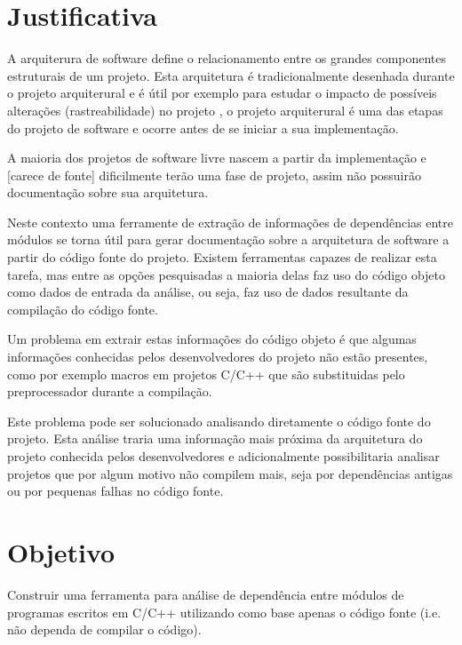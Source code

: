 \chapter{Justificativa}

A arquiterura de software define o relacionamento entre os grandes componentes
estruturais de um projeto\cite{EngenhariaDeSoftwarePressman}. Esta arquitetura
é tradicionalmente desenhada durante o projeto arquiterural e é útil por
exemplo para estudar o impacto de possíveis alterações (rastreabilidade) no
projeto \cite{mata26-terceiro-projeto-piloto}, o projeto arquiterural é uma das
etapas do projeto de software e ocorre antes de se iniciar a sua implementação.

A maioria dos projetos de software livre nascem a partir da implementação e
[carece de fonte] dificilmente terão uma fase de projeto, assim não possuirão
documentação sobre sua arquitetura. 

Neste contexto uma ferramente de extração de informações de dependências entre
módulos se torna útil para gerar documentação sobre a arquitetura de software a
partir do código fonte do projeto. Existem ferramentas capazes de realizar esta
tarefa, mas entre as opções pesquisadas\cite{SourceVersusObjectCodeExtraction}
a maioria delas faz uso do código objeto como dados de entrada da análise, ou
seja, faz uso de dados resultante da compilação do código fonte.

Um problema em extrair estas informações do código objeto é que algumas
informações conhecidas pelos desenvolvedores do projeto não estão presentes,
como por exemplo macros em projetos C/C++ que são substituidas pelo
preprocessador\cite{SourceVersusObjectCodeExtraction} durante a compilação.

Este problema pode ser solucionado analisando diretamente o código fonte do
projeto. Esta análise traria uma informação mais próxima da arquitetura do
projeto conhecida pelos desenvolvedores e adicionalmente possibilitaria
analisar projetos que por algum motivo não compilem mais, seja por dependências
antigas ou por pequenas falhas no código fonte.

\chapter{Objetivo}

Construir uma ferramenta para análise de dependência entre módulos de programas
escritos em C/C++ utilizando como base apenas o código fonte (i.e.  não dependa
de compilar o código).

